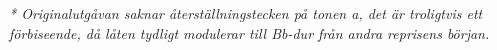 \vspace*{5mm}
\textit{* Originalutgåvan saknar återställningstecken på tonen a,
det är troligtvis ett förbiseende, då låten tydligt modulerar till Bb-dur
från andra reprisens början.}